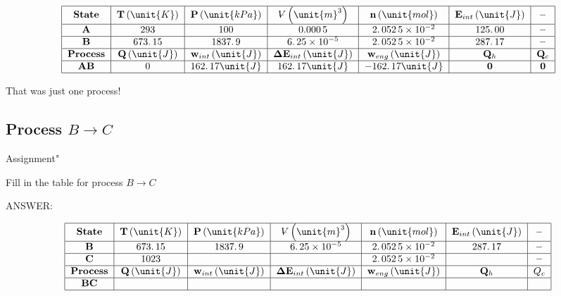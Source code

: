 \documentclass{article}
\begin{document}
\[
\begin{tabular}{|c|c|c|c|c|c|c|}
\hline
\textbf{State} & $\mathbf{T}\left( \unit{K}\right) $ & $\mathbf{P}\left( 
\unit{kPa}\right) $ & $%
\ooalign{\hfil$V$\hfil\cr\kern0.1em--\hfil\cr}%
\left( \unit{m}^{3}\right) $ & $\mathbf{n}\left( \unit{mol}\right) $ & $%
\mathbf{E}_{int}\left( \unit{J}\right) $ & \textbf{--} \\ \hline
$\mathbf{A}$ & $293$ & $100$ & $0.000\,5$ & $2.\,052\,5\times 10^{-2}$ & $%
\allowbreak 125.\,\allowbreak 00$ & \textbf{--} \\ \hline
$\mathbf{B}$ & $673.\,\allowbreak 15$ & $\allowbreak 1837.\,\allowbreak 9$ & 
$6.\,25\times 10^{-5}$ & $2.\,052\,5\times 10^{-2}$ & $287.\,\allowbreak 17$
& \textbf{--} \\ \hline
\textbf{Process} & $\mathbf{Q}\left( \unit{J}\right) $ & $\mathbf{w}%
_{int}\left( \unit{J}\right) $ & $\mathbf{\Delta E}_{int}\left( \unit{J}%
\right) $ & $\mathbf{w}_{eng}\left( \unit{J}\right) $ & $\mathbf{Q}_{h}$ & $%
\mathbf{Q}_{c}$ \\ \hline
$\mathbf{AB}$ & $0$ & $\allowbreak 162.\,\allowbreak 17\unit{J}$ & $%
\allowbreak 162.\,\allowbreak 17\unit{J}$ & $-\allowbreak 162.\,\allowbreak
17\unit{J}$ & $\mathbf{0}$ & $\mathbf{0}$ \\ \hline
\end{tabular}%
\]

That was just one process!\pagebreak

\subsection{\textbf{Process }$B\rightarrow C$}

Assignment"

Fill in the table for process $B\rightarrow C$

ANSWER:

\[
\begin{tabular}{|c|c|c|c|c|c|c|}
\hline
\textbf{State} & $\mathbf{T}\left( \unit{K}\right) $ & $\mathbf{P}\left( 
\unit{kPa}\right) $ & $%
\ooalign{\hfil$V$\hfil\cr\kern0.1em--\hfil\cr}%
\left( \unit{m}^{3}\right) $ & $\mathbf{n}\left( \unit{mol}\right) $ & $%
\mathbf{E}_{int}\left( \unit{J}\right) $ & \textbf{--} \\ \hline
$\mathbf{B}$ & $673.\,\allowbreak 15$ & $\allowbreak 1837.\,\allowbreak 9$ & 
$6.\,25\times 10^{-5}$ & $2.\,052\,5\times 10^{-2}$ & $287.\,\allowbreak 17$
& \textbf{--} \\ \hline
$\mathbf{C}$ & $1023$ &  &  & $2.\,052\,5\times 10^{-2}$ &  & \textbf{--} \\ 
\hline
\textbf{Process} & $\mathbf{Q}\left( \unit{J}\right) $ & $\mathbf{w}%
_{int}\left( \unit{J}\right) $ & $\mathbf{\Delta E}_{int}\left( \unit{J}%
\right) $ & $\mathbf{w}_{eng}\left( \unit{J}\right) $ & $\mathbf{Q}_{h}$ & $%
Q_{c}$ \\ \hline
$\mathbf{BC}$ &  &  &  &  &  &  \\ \hline
\end{tabular}%
\]
\end{document}
